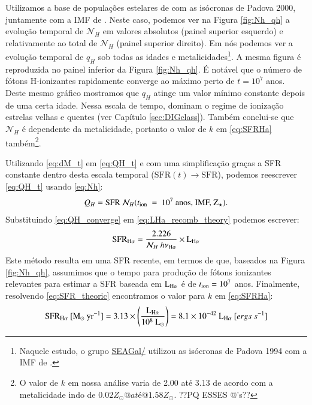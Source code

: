 Utilizamos a base de populações estelares de \citet{Bruzual.Charlot.2003} com as isócronas de Padova 2000, juntamente com a IMF de \citet{Salpeter.1955a}. Neste caso, podemos ver na Figura \ref{fig:Nh_qh} a evolução temporal de $\mathcal{N}_H$ em valores absolutos (painel superior esquerdo) e relativamente ao total de $\mathcal{N}_H$ (painel superior direito). Em \citet[Figura 2b]{CidFernandes.etal.2011a} nós podemos ver a evolução temporal de $q_H$ sob todas as idades e metalicidades\footnote{Naquele estudo, o grupo \href{http://starlight.ufsc.br}{SEAGal/\STARLIGHT} utilizou as isócronas de Padova 1994 com a IMF de \citet{Chabrier.2003a}.}. A mesma figura é reproduzida no painel inferior da Figura \ref{fig:Nh_qh}. É notável que o número de fótons H-ionizantes rapidamente converge ao máximo perto de $t = 10^7$ anos. Deste mesmo gráfico mostramos que $q_H$ atinge um valor mínimo constante depois de uma certa idade. Nessa escala de tempo, dominam o regime de ionização estrelas velhas e quentes (ver Capítulo \ref{sec:DIGclass}). Também conclui-se que $\mathcal{N}_H$ é dependente da metalicidade, portanto o valor de $k$ em \eqref{eq:SFRHa} também\footnote{O valor de $k$ em nossa análise varia de 2.00 até 3.13 de acordo com a metalicidade indo de $0.02 Z_\odot@ até @1.58 Z_\odot$. {\ATR \ojo ??PQ ESSES @'s??}}. 

Utilizando \eqref{eq:dM_t} em \eqref{eq:QH_t} e com uma simplificação graças a SFR constante dentro desta escala temporal ($\mathrm{SFR}(t)\rightarrow \mathrm{SFR}$), podemos reescrever \eqref{eq:QH_t} usando \eqref{eq:Nh}:
\begin{equation}
	Q_H = \mathrm{SFR}\ \mathcal{N}_H(t_{\rm ion}\ =\ 10^7\ \textrm{anos, IMF, Z}{}_\star).
	\label{eq:QH_converge}
\end{equation}
\noindent Substituindo \eqref{eq:QH_converge} em \eqref{eq:LHa_recomb_theory} podemos escrever:
\begin{equation}
	\mathrm{SFR}_{\Ha} = \frac{2.226}{\mathcal{N}_H\ h \nu_{\Ha}} \times \LHalpha
	\label{eq:SFR_theoric}
\end{equation}
\noindent 
{ Este método resulta em uma SFR recente, em termos de que, baseados na Figura \ref{fig:Nh_qh}, assumimos que o tempo para produção de fótons ionizantes relevantes para estimar a SFR baseada em $\LHalpha$ é de $t_{\rm ion} = 10^7$ anos}. Finalmente, resolvendo \eqref{eq:SFR_theoric} encontramos o valor para $k$ em \eqref{eq:SFRHa}:
\begin{equation}
	\mathrm{SFR}_{\Ha}\ [\mathrm{M}_\odot\ \mathrm{yr}^{-1}] = 3.13 \times
	\left(\frac{\LHalpha}{10^8\ \mathrm{L}_\odot}\right) = 8.1 \times 10^{-42}\ \LHalpha\ [ergs\ s^{-1}]
	\label{eq:SFRNeb}
\end{equation}

